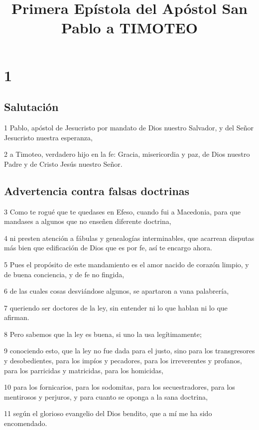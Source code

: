 
\title{Primera Epístola del Apóstol San Pablo a TIMOTEO}

\chapter{1}

\section*{Salutación}

\par 1 Pablo, apóstol de Jesucristo por mandato de Dios nuestro Salvador, y del Señor Jesucristo nuestra esperanza,
\par 2 a Timoteo, verdadero hijo en la fe: Gracia, misericordia y paz, de Dios nuestro Padre y de Cristo Jesús nuestro Señor.

\section*{Advertencia contra falsas doctrinas}

\par 3 Como te rogué que te quedases en Efeso, cuando fui a Macedonia, para que mandases a algunos que no enseñen diferente doctrina,
\par 4 ni presten atención a fábulas y genealogías interminables, que acarrean disputas más bien que edificación de Dios que es por fe, así te encargo ahora.
\par 5 Pues el propósito de este mandamiento es el amor nacido de corazón limpio, y de buena conciencia, y de fe no fingida,
\par 6 de las cuales cosas desviándose algunos, se apartaron a vana palabrería,
\par 7 queriendo ser doctores de la ley, sin entender ni lo que hablan ni lo que afirman.
\par 8 Pero sabemos que la ley es buena, si uno la usa legítimamente;
\par 9 conociendo esto, que la ley no fue dada para el justo, sino para los transgresores y desobedientes, para los impíos y pecadores, para los irreverentes y profanos, para los parricidas y matricidas, para los homicidas,
\par 10 para los fornicarios, para los sodomitas, para los secuestradores, para los mentirosos y perjuros, y para cuanto se oponga a la sana doctrina,
\par 11 según el glorioso evangelio del Dios bendito, que a mí me ha sido encomendado.

